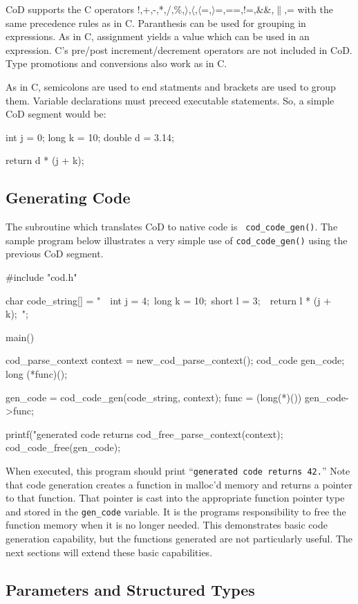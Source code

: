 CoD supports the C operators
!,+,-,*,/,\%,$\rangle$,$\langle$,$\langle$=,$\rangle$=,==,!=,\&\&,$\|$,= with
the same precedence rules as in C.  Paranthesis can be used for grouping in
expressions.  As in C, assignment yields a value which can be used in an
expression.  C's pre/post increment/decrement operators are not included in
CoD.  Type promotions and conversions also work as in C.

As in C, semicolons are used to end statments and brackets are used to group
them.   Variable declarations must preceed executable statements.  So, a
simple CoD segment would be:
\begin{Code}
{
    int j = 0;
    long k = 10;
    double d = 3.14;

    return d * (j + k);
}
\end{Code}
\subsection{Generating Code}
The subroutine which translates CoD to native code is {\tt
cod\_code\_gen()}.  The sample program below illustrates a very simple use of
{\tt cod\_code\_gen()} using the previous CoD segment.
\begin{Code}
#include "cod.h"

char code_string[] = "\
{\n\
    int j = 4;\n\
    long k = 10;\n\
    short l = 3;\n\
\n\
    return l * (j + k);\n\
}";

main()
{
    cod_parse_context context = new_cod_parse_context();
    cod_code gen_code;
    long (*func)();

    gen_code = cod_code_gen(code_string, context);
    func = (long(*)()) gen_code->func;

    printf("generated code returns %
    cod_free_parse_context(context);
    cod_code_free(gen_code);
}
\end{Code}

When executed, this program should print ``{\tt generated code returns 42.}''
Note that code generation creates a function in malloc'd memory and returns a
pointer to that function.  That pointer is cast into the appropriate function
pointer type and stored in the {\tt gen\_code} variable.  It is the programs
responsibility to free the function memory when it is no longer needed.  This
demonstrates basic code generation capability, but the functions generated are
not particularly useful.  The next sections will extend these basic
capabilities. 

\subsection{Parameters and Structured Types}

